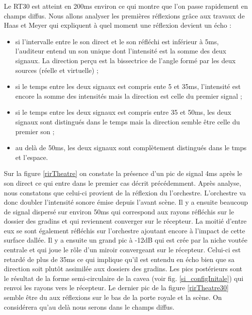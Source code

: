 Le RT30 est atteint en 200ms environ ce qui montre que l'on passe rapidement en champs diffus. Nous allons analyser les premières réflexions grâce aux travaux de Haas et Meyer \cite[p.49]{haas} qui expliquent à quel moment une réflexion devient un écho :
\begin{itemize}
\item si l'intervalle entre le son direct et le son réfléchi est inférieur à 5ms, l'auditeur entend un son unique dont l'intensité est la somme des deux signaux. La direction perçu est la bissectrice de l'angle formé par les deux sources (réelle et virtuelle) ;
\item si le temps entre les deux signaux est compris ente 5 et 35ms, l'intensité est encore la somme des intensités mais la direction est celle du premier signal ;
\item si le temps entre les deux signaux est compris entre 35 et 50ms, les deux signaux sont distingués dans le temps mais la direction semble être celle du premier son ;
\item au delà de 50ms, les deux signaux sont complètement distingués dans le tmps et l'espace.
\end{itemize}
Sur la figure \ref{rirTheatre} on constate la présence d'un pic de signal 4ms après le son direct ce qui entre dans le premier cas décrit précédemment. Après analyse, nous constatons que celui-ci provient de la réflexion du l'orchestre. L'orchestre va donc doubler l'intensité sonore émise depuis l'avant scène. Il y a ensuite beaucoup de signal dispersé sur environ 50ms qui correspond aux rayons réfléchis sur le dossier des gradins et qui reviennent converger sur le récepteur. La moitié d'entre eux se sont également réfléchis sur l'orchestre ajoutant encore à l'impact de cette surface dallée. Il y a ensuite un grand pic à -12dB qui est crée par la niche voutée centrale et qui joue le rôle d'un miroir convergeant sur le récepteur. Celui-ci est retardé de plus de 35ms ce qui implique qu'il est entendu en écho bien que sa direction soit plutôt assimilée aux dossiers des gradins. Les pics postérieurs sont le résultat de la forme semi-circulaire de la \gls{cavea} (voir fig. \ref{si_configInitale}) qui renvoi les rayons vers le récepteur. Le dernier pic de la figure \ref{rirTheatre30} semble être du aux réflexions sur le bas de la porte royale et la scène. On considérera qu'au delà nous serons dans le champs diffus.

